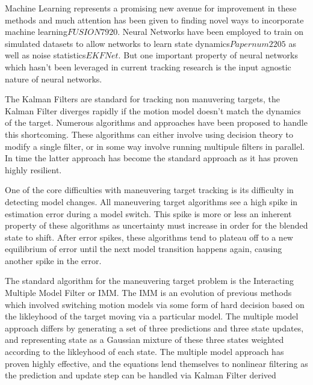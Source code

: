 \documentclass[twocolumn,letterpaper]{IEEEAerospaceCLS}  %
\begin{document}
Machine Learning represents a promising new avenue for improvement in these methods and much attention has been given to finding novel ways to incorporate machine learning$FUSION 7920$. Neural Networks have been employed to train on simulated datasets to allow networks to learn state dynamics$Paper num 2205$ as well as noise statistics$EKF Net$. But one important property of neural networks which hasn't been leveraged in current tracking research is the input agnostic nature of neural networks.

The Kalman Filters are standard for tracking non manuvering targets, the Kalman Filter diverges rapidly if the motion model doesn't match the dynamics of the target. Numerous algorithms and approaches have been proposed to handle this shortcoming. These algorithms can either involve using decision theory to modify a single filter, or in some way involve running multipule filters in parallel. In time the latter approach has become the standard approach as it has proven highly resilient.

One of the core difficulties with maneuvering target tracking is its difficulty in detecting model changes. All maneuvering target algorithms see a high spike in estimation error during a model switch. This spike is more or less an inherent property of these algorithms as uncertainty must increase in order for the blended state to shift. After error spikes, these algorithms tend to plateau off to a new equilibrium of error until the next model transition happens again, causing another spike in the error.

The standard algorithm for the maneuvering target problem is the Interacting Multiple Model Filter or IMM. The IMM is an evolution of previous methods which involved switching motion models via some form of hard decision based on the likleyhood of the target moving via a particular model. The multiple model approach differs by generating a set of three predictions and three state updates, and representing state as a Gaussian mixture of these three states weighted according to the likleyhood of each state.
The multiple model approach has proven highly effective, and the equations lend themselves to nonlinear filtering as the prediction and update step can be handled via Kalman Filter derived
\end{document}
